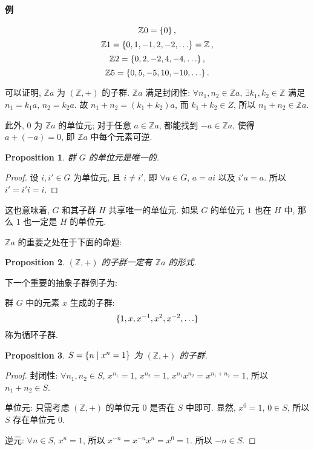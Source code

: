 \documentclass[UTF8]{ctexart}
\theoremstyle{mystyle}
\newtheorem{proposition}{Proposition}[section]
\theoremstyle{myremark}
\theoremstyle{plain}
\newcommand{\Z}{\mathbb Z}
\DeclarePairedDelimiter\set{\{}{\}}
\begin{document}
\paragraph{例}
\[ \Z 0 = \set{0} \,,\]
\[ \Z 1 = \set{0, 1, -1, 2, -2, \dots} = \Z \,,\]
\[ \Z 2 = \set{0, 2, -2, 4, -4, \dots} \,,\]
\[ \Z 5 = \set{0, 5, -5, 10, -10, \dots} \,.\]


可以证明, $ \Z a $ 为 $ (\Z, +) $ 的子群. $ \Z a $ 满足封闭性: $ \forall n_1, n_2 \in \Z a $, $ \exists k_1, k_2 \in \Z $ 满足 $ n_1 = k_1 a $, $ n_2 = k_2 a $. 故 $ n_1 + n_2 = (k_1 + k_2) a $, 而 $ k_1 + k_2 \in Z $, 所以 $ n_1 + n_2 \in \Z a $.

此外, $ 0 $ 为 $ \Z a $ 的单位元; 对于任意 $ a \in \Z a $, 都能找到 $ -a \in \Z a $, 使得 $ a + (-a) = 0 $, 即 $ \Z a $ 中每个元素可逆.


\begin{proposition}
    群 $ G $ 的单位元是唯一的.
\end{proposition}

\begin{proof}
    设 $ i, i' \in G $ 为单位元, 且 $ i \neq i' $, 即 $ \forall a \in G $, $ a = a i $ 以及 $ i' a = a $. 所以 $ i' = i' i = i $.
\end{proof}

这也意味着, $ G $ 和其子群 $ H $ 共享唯一的单位元. 如果 $ G $ 的单位元 $ 1 $ 也在 $ H $ 中, 那么 $ 1 $ 也一定是 $ H $ 的单位元.

$ \Z a $ 的重要之处在于下面的命题:
\begin{proposition}
    $ (\Z, +) $ 的子群一定有 $ \Z a $ 的形式.
\end{proposition}


下一个重要的抽象子群例子为:
\begin{definition}
    群 $ G $ 中的元素 $ x $ 生成的子群: 
    \[ \set{1, x, x^{-1}, x^2, x^{-2}, \dots} \]
    称为循环子群.
\end{definition}

\begin{proposition}
    $ S = \set{n \mid x^n = 1} $ 为 $ (\Z, +) $ 的子群.
\end{proposition}

\begin{proof}
    封闭性: $ \forall n_1, n_2 \in S $, $ x^{n_1} = 1 $, $ x^{n_2} = 1 $, $ x^{n_1} x^{n_2} = x^{n_1 + n_2} = 1 $, 所以 $ n_1 + n_2 \in S $.

    单位元: 只需考虑 $ (\Z, +) $ 的单位元 $ 0 $ 是否在 $ S $ 中即可. 显然, $ x^0 = 1 $, $ 0 \in S $, 所以 $ S $ 存在单位元 $ 0 $.

    逆元: $ \forall n \in S $, $ x^n = 1 $, 所以 $ x^{-n} = x^{-n} x^n = x^0 = 1 $. 所以 $ -n \in S $.
\end{proof}
\end{document}
